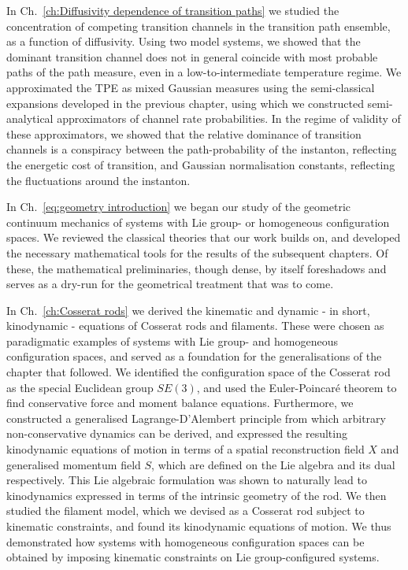 \documentclass[]{cam-thesis}
\begin{document}
In Ch.~\ref{ch:Diffusivity dependence of transition paths} we studied the concentration of competing transition channels in the transition path ensemble, as a function of diffusivity. Using two model systems, we showed that the dominant transition channel does not in general coincide with most probable paths of the path measure, even in a low-to-intermediate temperature regime. We approximated the TPE as mixed Gaussian measures using the semi-classical expansions developed in the previous chapter, using which we constructed semi-analytical approximators of channel rate probabilities. In the regime of validity of these approximators, we showed that the relative dominance of transition channels is a conspiracy between the path-probability of the instanton, reflecting the energetic cost of transition, and Gaussian normalisation constants, reflecting the fluctuations around the instanton.

In Ch.~\ref{eq:geometry introduction} we began our study of the geometric continuum mechanics of systems with Lie group- or homogeneous configuration spaces. We reviewed the classical theories that our work builds on, and developed the necessary mathematical tools for the results of the subsequent chapters. Of these, the mathematical preliminaries, though dense, by itself foreshadows and serves as a dry-run for the geometrical treatment that was to come.

In Ch.~\ref{ch:Cosserat rods} we derived the kinematic and dynamic - in short, kinodynamic - equations of Cosserat rods and filaments. These were chosen as paradigmatic examples of systems with Lie group- and homogeneous configuration spaces, and served as a foundation for the generalisations of the chapter that followed. We identified the configuration space of the Cosserat rod as the special Euclidean group $SE(3)$, and used the Euler-Poincaré theorem to find conservative force and moment balance equations. Furthermore, we constructed a generalised Lagrange-D'Alembert principle from which arbitrary non-conservative dynamics can be derived, and expressed the resulting kinodynamic equations of motion in terms of a spatial reconstruction field $X$ and generalised momentum field $S$, which are defined on the Lie algebra and its dual respectively. This Lie algebraic formulation was shown to naturally lead to kinodynamics expressed in terms of the intrinsic geometry of the rod. We then studied the filament model, which we devised as a Cosserat rod subject to kinematic constraints, and found its kinodynamic equations of motion. We thus demonstrated how systems with homogeneous configuration spaces can be obtained by imposing kinematic constraints on Lie group-configured systems.
\end{document}
